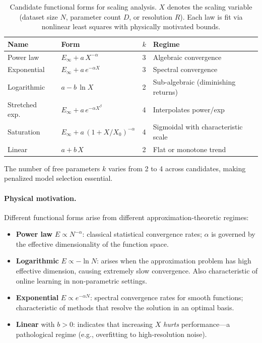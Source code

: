 \documentclass[11pt]{article}
\begin{document}
\begin{table}[h]
\centering
\caption{Candidate functional forms for scaling analysis.
$X$ denotes the scaling variable (dataset size $N$, parameter count $D$,
or resolution $R$). Each law is fit via nonlinear least squares with
physically motivated bounds.}
\label{tab:candidates}
\begin{tabular}{@{}llcl@{}}
\toprule
\textbf{Name} & \textbf{Form} & $k$ & \textbf{Regime} \\
\midrule
Power law     & $E_\infty + a\,X^{-\alpha}$ & 3
  & Algebraic convergence \\
Exponential   & $E_\infty + a\,e^{-\alpha X}$ & 3
  & Spectral convergence \\
Logarithmic   & $a - b\,\ln X$ & 2
  & Sub-algebraic (diminishing returns) \\
Stretched exp.\ & $E_\infty + a\,e^{-\alpha X^\beta}$ & 4
  & Interpolates power/exp \\
Saturation    & $E_\infty + a\,(1 + X/X_0)^{-\alpha}$ & 4
  & Sigmoidal with characteristic scale \\
Linear        & $a + b\,X$ & 2
  & Flat or monotone trend \\
\bottomrule
\end{tabular}
\end{table}

\noindent The number of free parameters $k$ varies from 2 to 4 across
candidates, making penalized model selection essential.

\paragraph{Physical motivation.}
Different functional forms arise from different approximation-theoretic
regimes:
\begin{itemize}
  \item \textbf{Power law} $E \propto N^{-\alpha}$: classical
    statistical convergence rates; $\alpha$ is governed by the effective
    dimensionality of the function space.
  \item \textbf{Logarithmic} $E \propto -\ln N$: arises when the
    approximation problem has high effective dimension, causing
    extremely slow convergence. Also characteristic of online learning
    in non-parametric settings.
  \item \textbf{Exponential} $E \propto e^{-\alpha N}$: spectral
    convergence rates for smooth functions; characteristic of methods
    that resolve the solution in an optimal basis.
  \item \textbf{Linear} with $b > 0$: indicates that increasing $X$
    \emph{hurts} performance---a pathological regime (e.g., overfitting
    to high-resolution noise).
\end{itemize}
\end{document}
